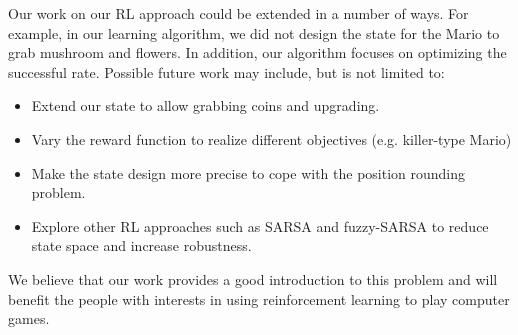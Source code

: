 Our work on our RL approach could be extended in a number of ways. For example, in our learning algorithm, we did not design the state for the Mario to grab mushroom and flowers. In addition, our algorithm focuses on optimizing the successful rate. Possible future work may include, but is not limited to:
\begin{itemize}
\item
Extend our state to allow grabbing coins and upgrading.
\item
Vary the reward function to realize different objectives (e.g. killer-type Mario)
\item
Make the state design more precise to cope with the position rounding problem.
\item
Explore other RL approaches such as SARSA\cite{SARSA} and fuzzy-SARSA\cite{fuzzySARSA} to  reduce state space and increase robustness.
\end{itemize}
We believe that our work provides a good introduction to this problem and will benefit the people with interests in using reinforcement learning to play computer games.

\newpage









%
